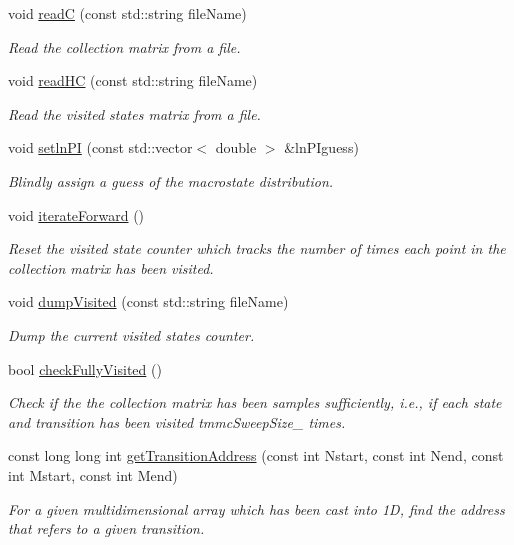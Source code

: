 \begin{DoxyCompactItemize}
void \hyperlink{classtmmc_a7d9ee0505dc801cbff55bc35c3654a61}{read\-C} (const std\-::string file\-Name)
\begin{DoxyCompactList}\small\item\em Read the collection matrix from a file. \end{DoxyCompactList}\item 
void \hyperlink{classtmmc_ab51a593d041a65c4ca47e6c4e0c26992}{read\-H\-C} (const std\-::string file\-Name)
\begin{DoxyCompactList}\small\item\em Read the visited states matrix from a file. \end{DoxyCompactList}\item 
void \hyperlink{classtmmc_a416db4e54e3d2ab23daed2e33468df4d}{setln\-P\-I} (const std\-::vector$<$ double $>$ \&ln\-P\-Iguess)
\begin{DoxyCompactList}\small\item\em Blindly assign a guess of the macrostate distribution. \end{DoxyCompactList}\item 
void \hyperlink{classtmmc_a611b5a86b3887afd9e90e2e4da66de35}{iterate\-Forward} ()
\begin{DoxyCompactList}\small\item\em Reset the visited state counter which tracks the number of times each point in the collection matrix has been visited. \end{DoxyCompactList}\item 
void \hyperlink{classtmmc_a295886d2f7a947a9de890bcb3adb51c7}{dump\-Visited} (const std\-::string file\-Name)
\begin{DoxyCompactList}\small\item\em Dump the current visited states counter. \end{DoxyCompactList}\item 
bool \hyperlink{classtmmc_aa51f03f958dabefcff97be4a7c3b336c}{check\-Fully\-Visited} ()
\begin{DoxyCompactList}\small\item\em Check if the the collection matrix has been samples sufficiently, i.\-e., if each state and transition has been visited tmmc\-Sweep\-Size\-\_\- times. \end{DoxyCompactList}\item 
const long long int \hyperlink{classtmmc_a8649336b47195c6ad50c437ff1f443e3}{get\-Transition\-Address} (const int Nstart, const int Nend, const int Mstart, const int Mend)
\begin{DoxyCompactList}\small\item\em For a given multidimensional array which has been cast into 1\-D, find the address that refers to a given transition. \end{DoxyCompactList}\item 

\end{DoxyCompactItemize}
